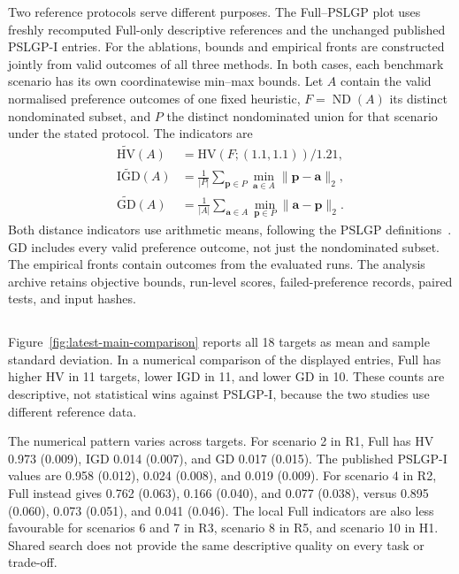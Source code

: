 Two reference protocols serve different purposes. The Full--PSLGP plot uses freshly recomputed Full-only descriptive references and the unchanged published PSLGP-I entries. For the ablations, bounds and empirical fronts are constructed jointly from valid outcomes of all three methods. In both cases, each benchmark scenario has its own coordinatewise min--max bounds. Let $A$ contain the valid normalised preference outcomes of one fixed heuristic, $F=\operatorname{ND}(A)$ its distinct nondominated subset, and $P$ the distinct nondominated union for that scenario under the stated protocol. The indicators are
\begin{equation}
\begin{aligned}
\widetilde{\mathrm{HV}}(A)&=\mathrm{HV}(F;(1.1,1.1))/1.21,\\
\widetilde{\mathrm{IGD}}(A)&=\frac{1}{|P|}\sum_{\mathbf p\in P}\min_{\mathbf a\in A}\|\mathbf p-\mathbf a\|_2,\\
\widetilde{\mathrm{GD}}(A)&=\frac{1}{|A|}\sum_{\mathbf a\in A}\min_{\mathbf p\in P}\|\mathbf a-\mathbf p\|_2.
\end{aligned}
\label{eq:descriptive-test-metrics}
\end{equation}
Both distance indicators use arithmetic means, following the PSLGP definitions~\cite{xu2026pslgp}. GD includes every valid preference outcome, not just the nondominated subset. The empirical fronts contain outcomes from the evaluated runs. The analysis archive retains objective bounds, run-level scores, failed-preference records, paired tests, and input hashes.

\subsection{}
Figure~\ref{fig:latest-main-comparison} reports all 18 targets as mean and sample standard deviation. In a numerical comparison of the displayed entries, Full has higher HV in 11 targets, lower IGD in 11, and lower GD in 10. These counts are descriptive, not statistical wins against PSLGP-I, because the two studies use different reference data.

The numerical pattern varies across targets. For scenario 2 in R1, Full has HV 0.973 (0.009), IGD 0.014 (0.007), and GD 0.017 (0.015). The published PSLGP-I values are 0.958 (0.012), 0.024 (0.008), and 0.019 (0.009). For scenario 4 in R2, Full instead gives 0.762 (0.063), 0.166 (0.040), and 0.077 (0.038), versus 0.895 (0.060), 0.073 (0.051), and 0.041 (0.046). The local Full indicators are also less favourable for scenarios 6 and 7 in R3, scenario 8 in R5, and scenario 10 in H1. Shared search does not provide the same descriptive quality on every task or trade-off.

